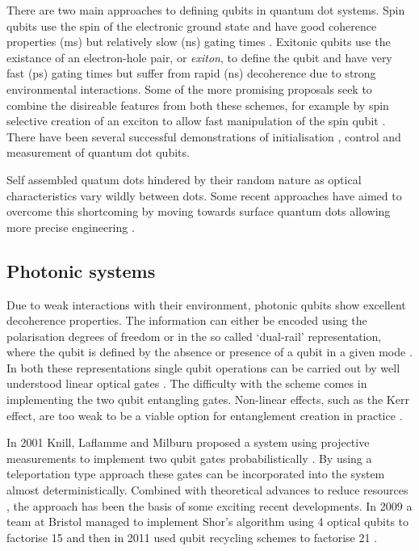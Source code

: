 There are two main approaches to defining qubits in quantum dot systems. Spin qubits use the spin of the electronic ground state and have good coherence properties (ms) \cite{Kroutvar:2004p4951, Greilich:2006p5031} but relatively slow (ns) gating times \cite{Burkard:1999p5057}. Exitonic qubits use the existance of an electron-hole pair, or \textit{exiton}, to define the qubit and have very fast (ps) gating times \cite{Li:2003p5178} but suffer from rapid (ns) decoherence due to strong environmental interactions. Some of the more promising proposals seek to combine the disireable features from both these schemes, for example by spin selective creation of an exciton to allow fast manipulation of the spin qubit \cite{Calarco:2003p5363, Chen:2000p5290, Yokoi:2005p5390}. There have been several successful demonstrations of initialisation \cite{atature_quantum_dot_06, gerardot_dot_08}, control \cite{quantum_dot_control_08} and measurement \cite{quantum_dot_measurement_06} of quantum dot qubits.

Self assembled quatum dots hindered by their random nature as optical characteristics vary wildly between dots. Some recent approaches have aimed to overcome this shortcoming by moving towards surface quantum dots allowing more precise engineering \cite{quantum_dot_nanowires_example}.


\subsection{Photonic systems}

Due to weak interactions with their environment, photonic qubits show excellent decoherence properties. The information can either be encoded using the polarisation degrees of freedom or in the so called `dual-rail’ representation, where the qubit is defined by the absence or presence of a qubit in a given mode \cite{loqc_review_07}. In both these representations single qubit operations can be carried out by well understood linear optical gates \cite{fox_quantum_optics, walls+milburn}. The difficulty with the scheme comes in implementing the two qubit entangling gates. Non-linear effects, such as the Kerr effect, are too weak to be a viable option for entanglement creation in practice \cite{kerr_too_weak_06}.

In 2001 Knill, Laflamme and Milburn proposed a system using projective measurements to implement two qubit gates probabilistically \cite{klm}. By using a teleportation type approach these gates can be incorporated into the system almost deterministically. Combined with theoretical advances to reduce resources \cite{science_loqc_review}, the approach has been the basis of some exciting recent developments. In 2009 a team at Bristol managed to implement Shor's algorithm using 4 optical qubits to factorise 15 \cite{shor_chip_bristol} and then in 2011 used qubit recycling schemes to factorise 21 \cite{shor_chip_bristol_2}.  

